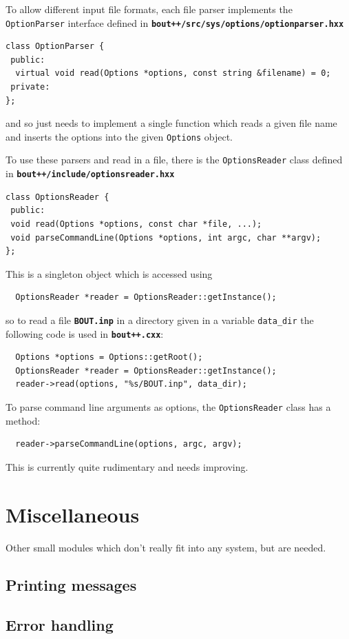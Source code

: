 \documentclass[12pt]{article}
\newcommand{\file}[1]{\texttt{\bf #1}}
\begin{document}
To allow different input file formats, each file parser implements
the \lstinline!OptionParser! interface defined in
\file{bout++/src/sys/options/optionparser.hxx}
\begin{lstlisting}
class OptionParser {
 public:
  virtual void read(Options *options, const string &filename) = 0;
 private:
};
\end{lstlisting}
and so just needs to implement a single function which reads a
given file name and inserts the options into the given \lstinline!Options!
object.

To use these parsers and read in a file, there is the
\lstinline!OptionsReader! class defined in
\file{bout++/include/optionsreader.hxx} 
\begin{lstlisting}
class OptionsReader {
 public:
 void read(Options *options, const char *file, ...);
 void parseCommandLine(Options *options, int argc, char **argv);
};
\end{lstlisting}
This is a singleton object which is accessed using
\begin{lstlisting}
  OptionsReader *reader = OptionsReader::getInstance();
\end{lstlisting}
so to read a file \file{BOUT.inp} in a directory given in a variable
\lstinline!data_dir! the following code is used in \file{bout++.cxx}:
\begin{lstlisting}
  Options *options = Options::getRoot();
  OptionsReader *reader = OptionsReader::getInstance();
  reader->read(options, "%s/BOUT.inp", data_dir);
\end{lstlisting}

To parse command line arguments as options, the \lstinline!OptionsReader!
class has a method:
\begin{lstlisting}
  reader->parseCommandLine(options, argc, argv);
\end{lstlisting}
This is currently quite rudimentary and needs improving.

\section{Miscellaneous}

Other small modules which don't really fit into any system, but are needed.


\subsection{Printing messages}


\subsection{Error handling}




\printindex
\end{document}
